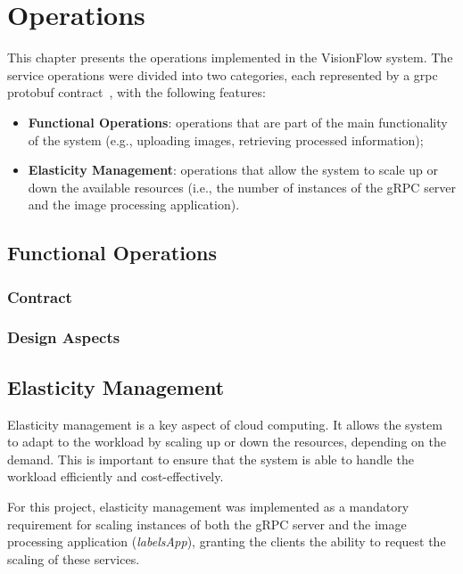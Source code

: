 \chapter{Operations}\label{ch:operations}

This chapter presents the operations implemented in the VisionFlow system.
The service operations were divided into two categories, each represented by a grpc protobuf contract~\cite{grpc-protobuf}, with the following features:

\begin{itemize}
    \item \textbf{Functional Operations}: operations that are part of the main functionality of the system (e.g., uploading images, retrieving processed information);
    \item \textbf{Elasticity Management}: operations that allow the system to scale up or down the available resources (i.e., the number of instances of the gRPC server and the image processing application).
\end{itemize}


\section{Functional Operations}\label{sec:functional_operations}

\subsection{Contract}\label{subsec:functional-operations-contract}

\subsection{Design Aspects}\label{subsec:functional-operations-design-aspects}


\section{Elasticity Management}\label{sec:elasticity_management}

Elasticity management is a key aspect of cloud computing.
It allows the system to adapt to the workload by scaling up or down the resources, depending on the demand.
This is important to ensure that the system is able to handle the workload efficiently and cost-effectively.

For this project,
elasticity management was implemented as a mandatory requirement for scaling instances of both the gRPC server and the image processing application
(\textit{labelsApp}), granting the clients the ability to request the scaling of these services.

